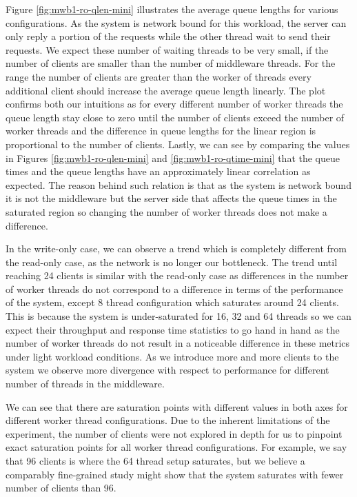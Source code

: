 \documentclass[11pt,a4paper]{article}
\begin{document}
\par {} Figure \ref{fig:mwb1-ro-qlen-mini} illustrates the average queue lengths for various configurations. As the system is network bound for this workload, the server can only reply a portion of the requests while the other thread wait to send their requests. We expect these number of waiting threads to be very small, if the number of clients are smaller than the number of middleware threads. For the range the number of clients are greater than the worker of threads every additional client should increase the average queue length linearly. The plot confirms both our intuitions as for every different number of worker threads the queue length stay close to zero until the number of clients exceed the number of worker threads and the difference in queue lengths for the linear region is proportional to the number of clients. Lastly, we can see by comparing the values in Figures \ref{fig:mwb1-ro-qlen-mini} and \ref{fig:mwb1-ro-qtime-mini} that the queue times and the queue lengths have an approximately linear correlation as expected. The reason behind such relation is that as the system is network bound it is not the middleware but the server side that affects the queue times in the saturated region so changing the number of worker threads does not make a difference.
\\
\par In the write-only case, we can observe a trend which is completely different from the read-only case, as the network is no longer our bottleneck. The trend until reaching 24 clients is similar with the read-only case as differences in the number of worker threads do not correspond to a difference in terms of the performance of the system, except 8 thread configuration which saturates around 24 clients. This is because the system is under-saturated for 16, 32 and 64 threads so we can expect their throughput and response time statistics to go hand in hand as the number of worker threads do not result in a noticeable difference in these metrics under light workload conditions. As we introduce more and more clients to the system we observe more divergence with respect to performance for different number of threads in the middleware.
\par We can see that there are saturation points with different values in both axes for different worker thread configurations. Due to the inherent limitations of the experiment, the number of clients were not explored in depth for us to pinpoint exact saturation points for all worker thread configurations. For example, we say that 96 clients is where the 64 thread setup saturates, but we believe a comparably fine-grained study might show that the system saturates with fewer number of clients than 96.
\end{document}

